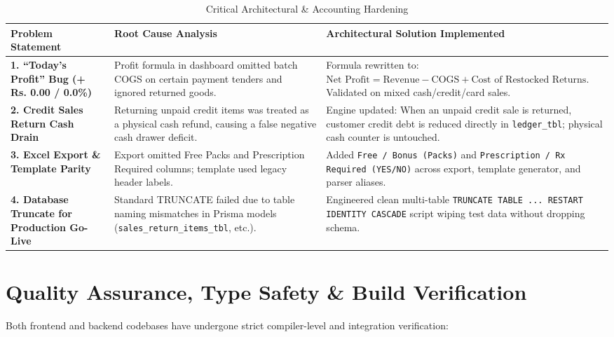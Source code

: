 \documentclass[10pt,a4paper]{article}
\begin{document}
\begin{table}[h!]
\centering
\small
\begin{tabularx}{\textwidth}{>{\bfseries\color{NavyDark}}p{3.2cm}p{4.2cm}X}
\toprule
\rowcolor{NavyDark}
\color{white}Problem Statement & \color{white}Root Cause Analysis & \color{white}Architectural Solution Implemented \\
\midrule
1. ``Today's Profit'' Bug (+ Rs. 0.00 / 0.0\%) & Profit formula in dashboard omitted batch COGS on certain payment tenders and ignored returned goods. & Formula rewritten to: $\text{Net Profit} = \text{Revenue} - \text{COGS} + \text{Cost of Restocked Returns}$. Validated on mixed cash/credit/card sales. \\
\rowcolor{SlateLight}
2. Credit Sales Return Cash Drain & Returning unpaid credit items was treated as a physical cash refund, causing a false negative cash drawer deficit. & Engine updated: When an unpaid credit sale is returned, customer credit debt is reduced directly in \texttt{ledger\_tbl}; physical cash counter is untouched. \\
3. Excel Export \& Template Parity & Export omitted Free Packs and Prescription Required columns; template used legacy header labels. & Added \texttt{Free / Bonus (Packs)} and \texttt{Prescription / Rx Required (YES/NO)} across export, template generator, and parser aliases. \\
\rowcolor{SlateLight}
4. Database Truncate for Production Go-Live & Standard TRUNCATE failed due to table naming mismatches in Prisma models (\texttt{sales\_return\_items\_tbl}, etc.). & Engineered clean multi-table \texttt{TRUNCATE TABLE ... RESTART IDENTITY CASCADE} script wiping test data without dropping schema. \\
\bottomrule
\end{tabularx}
\caption{Critical Architectural \& Accounting Hardening}
\end{table}

\section{Quality Assurance, Type Safety \& Build Verification}

Both frontend and backend codebases have undergone strict compiler-level and integration verification:
\end{document}
